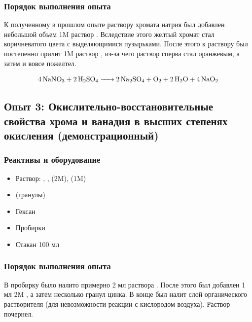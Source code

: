 \documentclass[a4paper, 12pt]{article}
\begin{document}
\subsubsection{Порядок выполнения опыта}

К полученному в прошлом опыте раствору хромата натрия был добавлен небольшой объем 1M раствор . Вследствие этого желтый хромат стал коричневатого цвета с выделяющимися пузырьками. После этого к раствору был постепенно прилит 1M раствор , из-за чего раствор сперва стал оранжевым, а затем и вовсе пожелтел.

\begin{equation}
	\ce{4NaNO3 + 2H2SO4 -> 2 Na2SO4 + O2 + 2 H2O + 4 NaO2}
\end{equation}


\subsection{Опыт 3: Окислительно-восстановительные свойства хрома и ванадия в высших степенях окисления (демонстрационный)}

\subsubsection{Реактивы и оборудование}

\begin{itemize}
	\item Раствор: , ,  (2M),  (1M)
	\item {} (гранулы)
	\item Гексан
	
	\item Пробирки
	\item Стакан 100 мл
\end{itemize}

\subsubsection{Порядок выполнения опыта}

В пробирку было налито примерно 2 мл раствора . После этого был добавлен 1 мл 2M , а затем несколько гранул цинка. В конце был налит слой органического растворителя (для невозможности реакции с кислородом воздуха). Раствор почернел.
\end{document}
